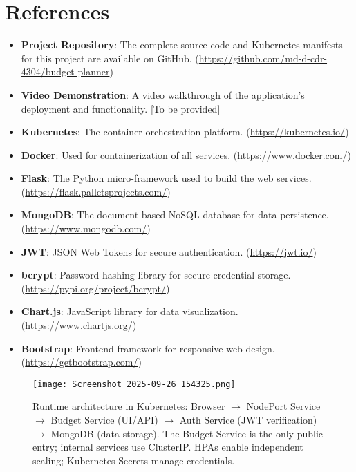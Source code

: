 \documentclass[conference]{IEEEtran}
\begin{document}
\section{\textbf{References}}
\begin{itemize}
    \item \textbf{Project Repository}: The complete source code and Kubernetes manifests for this project are available on GitHub. (\href{https://github.com/md-d-cdr-4304/budget-planner}{https://github.com/md-d-cdr-4304/budget-planner})
    \item \textbf{Video Demonstration}: A video walkthrough of the application's deployment and functionality. [To be provided]
    \item \textbf{Kubernetes}: The container orchestration platform. (\href{https://kubernetes.io/}{https://kubernetes.io/})
    \item \textbf{Docker}: Used for containerization of all services. (\href{https://www.docker.com/}{https://www.docker.com/})
    \item \textbf{Flask}: The Python micro-framework used to build the web services. (\href{https://flask.palletsprojects.com/}{https://flask.palletsprojects.com/})
    \item \textbf{MongoDB}: The document-based NoSQL database for data persistence. (\href{https://www.mongodb.com/}{https://www.mongodb.com/})
    \item \textbf{JWT}: JSON Web Tokens for secure authentication. (\href{https://jwt.io/}{https://jwt.io/})
    \item \textbf{bcrypt}: Password hashing library for secure credential storage. (\href{https://pypi.org/project/bcrypt/}{https://pypi.org/project/bcrypt/})
    \item \textbf{Chart.js}: JavaScript library for data visualization. (\href{https://www.chartjs.org/}{https://www.chartjs.org/})
    \item \textbf{Bootstrap}: Frontend framework for responsive web design. (\href{https://getbootstrap.com/}{https://getbootstrap.com/})
\end{itemize}
\balance

\vspace{1cm}
\begin{figure*}[!b]
  \centering
  \texttt{[image: Screenshot 2025-09-26 154325.png]}%
  \caption{Runtime architecture in Kubernetes: Browser $\rightarrow$ NodePort Service $\rightarrow$ Budget Service (UI/API) $\rightarrow$ Auth Service (JWT verification) $\rightarrow$ MongoDB (data storage). The Budget Service is the only public entry; internal services use ClusterIP. HPAs enable independent scaling; Kubernetes Secrets manage credentials.}
  \label{fig:arch}
\end{figure*}
\end{document}
